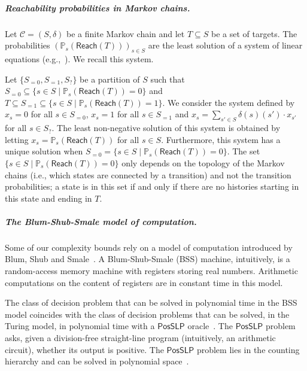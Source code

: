 \documentclass[a4paper,UKenglish,cleveref,autoref,thm-restate,colorlinks]{lipics-v2021}
\newcommand{\posSLP}{\textsf{PosSLP}}
\newcommand{\proba}{\mathbb{P}}
\newcommand{\probaMC}[1]{\proba_{#1}} \newcommand{\probaMCverb}[2]{\proba_{#1, #2}} \newcommand{\probaG}[2]{\probaMC{#1}^{#2}} \newcommand{\probaGverb}[3]{\probaMCverb{#1}{#2}^{#3}}
\newcommand{\mdpStateSpace}{S}
\newcommand{\mdpState}{s}
\newcommand{\mdpTrans}{\delta}
\newcommand{\mchain}{\mathcal{C}}
\newcommand{\mchainTuple}{(\mdpStateSpace, \mdpTrans)}
\newcommand{\reach}[1]{\mathsf{Reach}(#1)}
\newcommand{\target}{T}
\begin{document}
\subparagraph*{Reachability probabilities in Markov chains.}
Let $\mchain = \mchainTuple$ be a finite Markov chain and let $\target\subseteq\mdpStateSpace$ be a set of targets.
The probabilities $(\probaMC{\mdpState}(\reach{\target}))_{\mdpState\in\mdpStateSpace}$ are the least solution of a system of linear equations (e.g.,~\cite[Thm.~10.15]{BK08}).
We recall this system.

Let $\{\mdpStateSpace_{=0}, \mdpStateSpace_{=1}, \mdpStateSpace_{?}\}$ be a partition of $\mdpStateSpace$ such that $\mdpStateSpace_{=0} \subseteq\{\mdpState\in\mdpStateSpace\mid \probaMC{\mdpState}(\reach{\target}) = 0\}$ and $\target\subseteq\mdpStateSpace_{=1} \subseteq\{\mdpState\in\mdpStateSpace\mid \probaMC{\mdpState}(\reach{\target}) = 1\}$.
We consider the system defined by $x_\mdpState=0$ for all $\mdpState\in\mdpStateSpace_{=0}$, $x_\mdpState=1$ for all $\mdpState\in\mdpStateSpace_{=1}$ and $x_\mdpState = \sum_{\mdpState'\in\mdpStateSpace}\mdpTrans(\mdpState)(\mdpState')\cdot x_{\mdpState'}$ for all $\mdpState\in\mdpStateSpace_{?}$.
The least non-negative solution of this system is obtained by letting $x_\mdpState=\probaMC{\mdpState}(\reach{\target})$ for all $\mdpState\in\mdpStateSpace$.
Furthermore, this system has a unique solution when $\mdpStateSpace_{=0} =\{\mdpState\in\mdpStateSpace\mid \probaMC{\mdpState}(\reach{\target}) = 0\}$.
The set $\{\mdpState\in\mdpStateSpace\mid \probaMC{\mdpState}(\reach{\target}) = 0\}$ only depends on the topology of the Markov chains (i.e., which states are connected by a transition) and not the transition probabilities; a state is in this set if and only if there are no histories starting in this state and ending in $\target$.

\subparagraph*{The Blum-Shub-Smale model of computation.}
Some of our complexity bounds rely on a model of computation introduced by Blum, Shub and Smale~\cite{BSS1989}.
A Blum-Shub-Smale (BSS) machine, intuitively, is a random-access memory machine with registers storing real numbers.
Arithmetic computations on the content of registers are in constant time in this model.

The class of decision problem that can be solved in polynomial time in the BSS model coincides with the class of decision problems that can be solved, in the Turing model, in polynomial time with a $\posSLP$ oracle~\cite{DBLP:journals/siamcomp/AllenderBKM09}.
The $\posSLP$ problem asks, given a division-free straight-line program (intuitively, an arithmetic circuit), whether its output is positive.
The $\posSLP$ problem lies in the counting hierarchy and can be solved in polynomial space~\cite{DBLP:journals/siamcomp/AllenderBKM09}.
\end{document}

